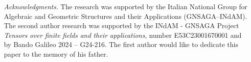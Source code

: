 \documentclass[11pt]{article}
\theoremstyle{definition}
\newtheorem{exa}[theorem]{Example}
\numberwithin{equation}{section}
\def\cL{\mathcal L}
\def\cP{\mathcal P}
\def\cU{\mathcal U}
\begin{document}


\bigskip
{\footnotesize
\noindent\textit{Acknowledgments.}
The research was supported by the Italian National Group for Algebraic and Geometric Structures and their Applications (GNSAGA--INdAM). The second author research was supported by the INdAM - GNSAGA Project \emph{Tensors over finite fields and their applications}, number E53C23001670001 and by Bando Galileo 2024 – G24-216. The first author would like to dedicate this paper to the memory of his father.}



\end{document}

